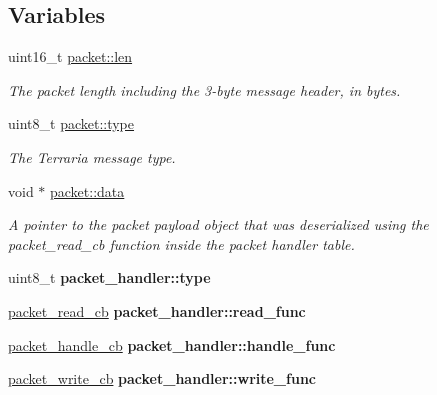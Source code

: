 \subsection*{Variables}
\begin{DoxyCompactItemize}
\item 
\hypertarget{group__packet_ga7b613bc0cf0d706a0c825dadfc6840d2}{}uint16\+\_\+t \hyperlink{group__packet_ga7b613bc0cf0d706a0c825dadfc6840d2}{packet\+::len}\label{group__packet_ga7b613bc0cf0d706a0c825dadfc6840d2}

\begin{DoxyCompactList}\small\item\em The packet length including the 3-\/byte message header, in bytes. \end{DoxyCompactList}\item 
\hypertarget{group__packet_ga53b4fdec86403ff886583182dfae176e}{}uint8\+\_\+t \hyperlink{group__packet_ga53b4fdec86403ff886583182dfae176e}{packet\+::type}\label{group__packet_ga53b4fdec86403ff886583182dfae176e}

\begin{DoxyCompactList}\small\item\em The Terraria message type. \end{DoxyCompactList}\item 
\hypertarget{group__packet_gad3115ffc58cc55bae08635ed965c4768}{}void $\ast$ \hyperlink{group__packet_gad3115ffc58cc55bae08635ed965c4768}{packet\+::data}\label{group__packet_gad3115ffc58cc55bae08635ed965c4768}

\begin{DoxyCompactList}\small\item\em A pointer to the packet payload object that was deserialized using the {\ttfamily packet\+\_\+read\+\_\+cb} function inside the packet handler table. \end{DoxyCompactList}\item 
\hypertarget{group__packet_gacda150a3844cee9928fc89d9c1e0204e}{}uint8\+\_\+t {\bfseries packet\+\_\+handler\+::type}\label{group__packet_gacda150a3844cee9928fc89d9c1e0204e}

\item 
\hypertarget{group__packet_ga043987d5914119b6cb9fd322cad1731c}{}\hyperlink{group__packet_ga60dc8d100ec60f5abb142f1f2253e6b2}{packet\+\_\+read\+\_\+cb} {\bfseries packet\+\_\+handler\+::read\+\_\+func}\label{group__packet_ga043987d5914119b6cb9fd322cad1731c}

\item 
\hypertarget{group__packet_ga83b542606e8c009aa6da139d5a89ed58}{}\hyperlink{group__packet_ga9d343d646c5c1e052d61561702a4bf3e}{packet\+\_\+handle\+\_\+cb} {\bfseries packet\+\_\+handler\+::handle\+\_\+func}\label{group__packet_ga83b542606e8c009aa6da139d5a89ed58}

\item 
\hypertarget{group__packet_ga54b6b0734e245ed023ef11387ec04c66}{}\hyperlink{group__packet_ga10aa1174318b280e6772d66ef7ff010e}{packet\+\_\+write\+\_\+cb} {\bfseries packet\+\_\+handler\+::write\+\_\+func}\label{group__packet_ga54b6b0734e245ed023ef11387ec04c66}

\end{DoxyCompactItemize}


